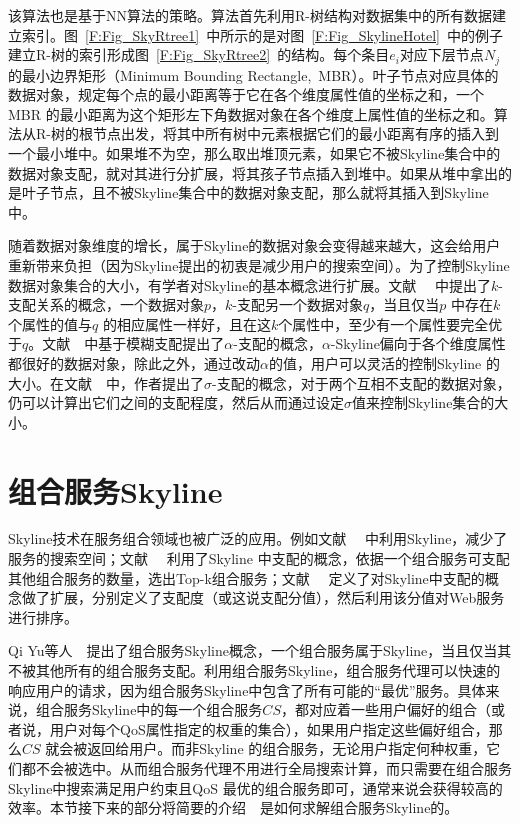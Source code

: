 \begin{enumerate}
  该算法也是基于NN算法的策略。算法首先利用R-树结构对数据集中的所有数据建立索引。图~\ref{F:Fig_SkyRtree1}~中所示的是对图~\ref{F:Fig_SkylineHotel}~中的例子建立R-树的索引形成图~\ref{F:Fig_SkyRtree2}~的结构。每个条目$e_{i}$对应下层节点$N_{j}$ 的最小边界矩形（Minimum Bounding Rectangle,~MBR）。叶子节点对应具体的数据对象，规定每个点的最小距离等于它在各个维度属性值的坐标之和，一个MBR 的最小距离为这个矩形左下角数据对象在各个维度上属性值的坐标之和。算法从R-树的根节点出发，将其中所有树中元素根据它们的最小距离有序的插入到一个最小堆中。如果堆不为空，那么取出堆顶元素，如果它不被Skyline集合中的数据对象支配，就对其进行分扩展，将其孩子节点插入到堆中。如果从堆中拿出的是叶子节点，且不被Skyline集合中的数据对象支配，那么就将其插入到Skyline中。

\end{enumerate}

随着数据对象维度的增长，属于Skyline的数据对象会变得越来越大，这会给用户重新带来负担（因为Skyline提出的初衷是减少用户的搜索空间）。为了控制Skyline数据对象集合的大小，有学者对Skyline的基本概念进行扩展。文献~\cite{chan2006finding}~ 中提出了$k$-支配关系的概念，一个数据对象$p$，$k$-支配另一个数据对象$q$，当且仅当$p$ 中存在$k$个属性的值与$q$ 的相应属性一样好，且在这$k$个属性中，至少有一个属性要完全优于$q$。文献~\cite{benouaret2011use}~中基于模糊支配提出了$\alpha$-支配的概念，$\alpha$-Skyline偏向于各个维度属性都很好的数据对象，除此之外，通过改动$\alpha$的值，用户可以灵活的控制Skyline 的大小。在文献~\cite{benouaret2012ws}~中，作者提出了$\sigma$-支配的概念，对于两个互相不支配的数据对象，仍可以计算出它们之间的支配程度，然后从而通过设定$\sigma$值来控制Skyline集合的大小。

\section{组合服务Skyline}

Skyline技术在服务组合领域也被广泛的应用。例如文献~\cite{alrifai2010selecting}~ 中利用Skyline，减少了服务的搜索空间；文献~\cite{zhang2013selecting,tang2012dominance,zhang2013efficient}~ 利用了Skyline 中支配的概念，依据一个组合服务可支配其他组合服务的数量，选出Top-k组合服务；文献~\cite{dai2013using,benouaret2011top}~ 定义了对Skyline中支配的概念做了扩展，分别定义了支配度（或这说支配分值），然后利用该分值对Web服务进行排序。

Qi Yu等人~\cite{yu2013efficient}~提出了组合服务Skyline概念，一个组合服务属于Skyline，当且仅当其不被其他所有的组合服务支配。利用组合服务Skyline，组合服务代理可以快速的响应用户的请求，因为组合服务Skyline中包含了所有可能的``最优''服务。具体来说，组合服务Skyline中的每一个组合服务$CS$，都对应着一些用户偏好的组合（或者说，用户对每个QoS属性指定的权重的集合），如果用户指定这些偏好组合，那么$CS$ 就会被返回给用户。而非Skyline 的组合服务，无论用户指定何种权重，它们都不会被选中。从而组合服务代理不用进行全局搜索计算，而只需要在组合服务Skyline中搜索满足用户约束且QoS 最优的组合服务即可，通常来说会获得较高的效率。本节接下来的部分将简要的介绍~\cite{yu2013efficient}~是如何求解组合服务Skyline的。

